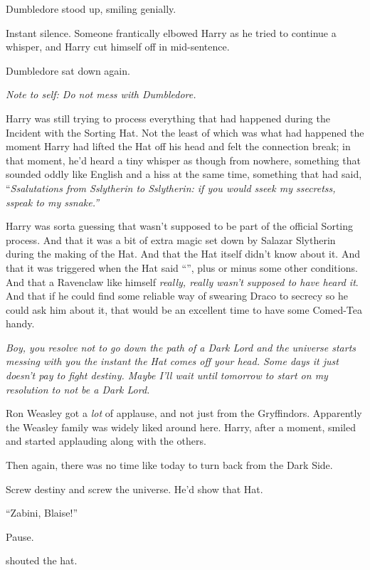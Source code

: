 Dumbledore stood up, smiling genially.

Instant silence. Someone frantically elbowed Harry as he tried to continue a whisper, and Harry cut himself off in mid-sentence.

Dumbledore sat down again.

\emph{Note to self: Do not mess with Dumbledore.}

Harry was still trying to process everything that had happened during the Incident with the Sorting Hat. Not the least of which was what had happened the moment Harry had lifted the Hat off his head and felt the connection break; in that moment, he’d heard a tiny whisper as though from nowhere, something that sounded oddly like English and a hiss at the same time, something that had said, “\emph{Ssalutations from Sslytherin to Sslytherin: if you would sseek my ssecretss, sspeak to my ssnake.”}

Harry was sorta guessing that wasn’t supposed to be part of the official Sorting process. And that it was a bit of extra magic set down by Salazar Slytherin during the making of the Hat. And that the Hat itself didn’t know about it. And that it was triggered when the Hat said “”, plus or minus some other conditions. And that a Ravenclaw like himself \emph{really, really wasn’t supposed to have heard it}. And that if he could find some reliable way of swearing Draco to secrecy so he could ask him about it, that would be an excellent time to have some Comed-Tea handy.

\emph{Boy, you resolve not to go down the path of a Dark Lord and the universe starts messing with you the instant the Hat comes off your head. Some days it just doesn’t pay to fight destiny. Maybe I’ll wait until tomorrow to start on my resolution to not be a Dark Lord.}


Ron Weasley got a \emph{lot} of applause, and not just from the Gryffindors. Apparently the Weasley family was widely liked around here. Harry, after a moment, smiled and started applauding along with the others.

Then again, there was no time like today to turn back from the Dark Side.

Screw destiny and screw the universe. He’d show that Hat.

“Zabini, Blaise!”

Pause.

 shouted the hat.


